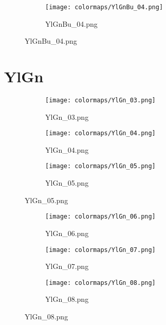 \documentclass{article}%
\begin{document}
%
\hspace{1cm}\hfill%


\begin{figure}[h!]%
\begin{subfigure}[b]{0.3\linewidth}%
\texttt{[image: colormaps/YlGnBu\_04.png]}%
\caption{YlGnBu\_04.png}%
\end{subfigure}%
\end{figure}

%
\newpage%
\section{YlGn}%
\label{sec:YlGn}%
\hspace{1cm}\hfill%
\hspace{1cm}\hfill%
\hspace{1cm}\hfill%


\begin{figure}[h!]%
\begin{subfigure}[b]{0.3\linewidth}%
\texttt{[image: colormaps/YlGn\_03.png]}%
\caption{YlGn\_03.png}%
\end{subfigure}%
\begin{subfigure}[b]{0.3\linewidth}%
\texttt{[image: colormaps/YlGn\_04.png]}%
\caption{YlGn\_04.png}%
\end{subfigure}%
\begin{subfigure}[b]{0.3\linewidth}%
\texttt{[image: colormaps/YlGn\_05.png]}%
\caption{YlGn\_05.png}%
\end{subfigure}%
\end{figure}

%
\hspace{1cm}\hfill%
\hspace{1cm}\hfill%
\hspace{1cm}\hfill%


\begin{figure}[h!]%
\begin{subfigure}[b]{0.3\linewidth}%
\texttt{[image: colormaps/YlGn\_06.png]}%
\caption{YlGn\_06.png}%
\end{subfigure}%
\begin{subfigure}[b]{0.3\linewidth}%
\texttt{[image: colormaps/YlGn\_07.png]}%
\caption{YlGn\_07.png}%
\end{subfigure}%
\begin{subfigure}[b]{0.3\linewidth}%
\texttt{[image: colormaps/YlGn\_08.png]}%
\caption{YlGn\_08.png}%
\end{subfigure}%
\end{figure}
\end{document}
